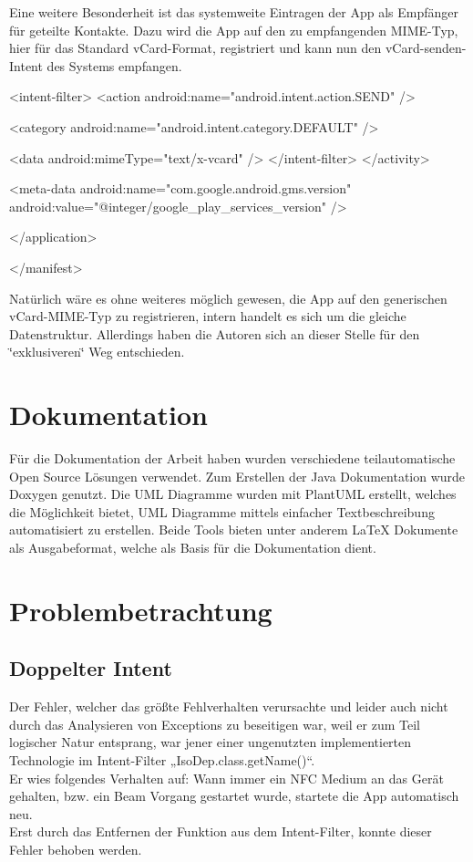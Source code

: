 \documentclass[a4paper,ngerman,12pt]{report}
\begin{document}
Eine weitere Besonderheit ist das systemweite Eintragen der App als Empfänger für geteilte Kontakte. Dazu wird die App auf den zu empfangenden MIME-Typ, hier für das Standard vCard-Format, registriert und kann nun den vCard-senden-Intent des Systems empfangen.

\begin{DoxyVerb}            <intent-filter>
                <action android:name="android.intent.action.SEND" />

                <category android:name="android.intent.category.DEFAULT" />

                <data android:mimeType="text/x-vcard" />
            </intent-filter>
        </activity>

        <meta-data
            android:name="com.google.android.gms.version"
            android:value="@integer/google_play_services_version" />

    </application>

</manifest>
\end{DoxyVerb}


Natürlich wäre es ohne weiteres möglich gewesen, die App auf den generischen vCard-MIME-Typ zu registrieren, intern handelt es sich um die gleiche Datenstruktur. Allerdings haben die Autoren sich an dieser Stelle für den \char`\"{}exklusiveren\char`\"{} Weg entschieden.

\section{Dokumentation}

Für die Dokumentation der Arbeit haben wurden verschiedene teilautomatische Open Source Lösungen verwendet. Zum Erstellen der Java Dokumentation wurde Doxygen genutzt. Die UML Diagramme wurden mit PlantUML erstellt, welches die Möglichkeit bietet, UML Diagramme mittels einfacher Textbeschreibung automatisiert zu erstellen. Beide Tools bieten unter anderem LaTeX Dokumente als Ausgabeformat, welche als Basis für die Dokumentation dient.

\section{Problembetrachtung}

\subsection*{Doppelter Intent}

Der Fehler, welcher das größte Fehlverhalten verursachte und leider auch nicht durch das Analysieren von Exceptions zu beseitigen war, weil er zum Teil logischer Natur entsprang, war jener einer ungenutzten implementierten Technologie im Intent-Filter „IsoDep.class.getName()“. \\
Er wies folgendes Verhalten auf: Wann immer ein NFC Medium an das Gerät gehalten, bzw. ein Beam Vorgang gestartet wurde, startete die App automatisch neu. \\
Erst durch das Entfernen der Funktion aus dem Intent-Filter, konnte dieser Fehler behoben werden.
\end{document}
